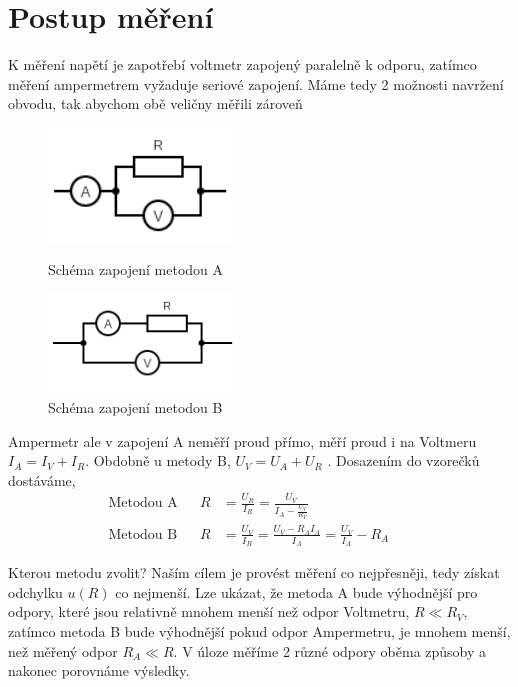 \documentclass[a4paper,11pt]{article}
\begin{document}
\section{Postup měření} 

K měření napětí je zapotřebí voltmetr zapojený paralelně k odporu, zatímco měření ampermetrem vyžaduje seriové zapojení.
Máme tedy 2 možnosti navržení obvodu, tak abychom obě veličny měřili zároveň

\begin{figure}[htbp]
  \begin{minipage}[t]{0.45\textwidth}
    \centering
    \includegraphics[width=5cm]{circuitA.png}
    \caption{Schéma zapojení metodou A}%
  \end{minipage}
  \hfil
  \begin{minipage}[t]{0.45\textwidth}
    \centering
    \includegraphics[width=5cm]{circuitB.png}
    \caption{Schéma zapojení metodou B}%
  \end{minipage}
\end{figure}

Ampermetr ale v zapojení A neměří proud přímo, měří proud i na Voltmeru $I_A = I_V + I_R$. Obdobně u metody B, $U_V = U_A + U_R$ . Dosazením do vzorečků dostáváme, \\

\begin{align}
  \label{eq:2}
  \text{Metodou A} & & R &= \frac{U_R}{I_R} = \frac{U_V}{I_A - \frac{U_V}{R_V}} & & \\[5pt]
  \label{eq:3}
  \text{Metodou B} & & R &= \frac{U_V}{I_R} = \frac{U_V - R_AI_A}{I_A} = \frac{U_V}{I_A} - R_A & &
\end{align}

Kterou metodu zvolit? Naším cílem je provést měření co nejpřesněji, tedy získat odchylku $u(R)$ co nejmenší.
Lze ukázat, že metoda A bude výhodnější pro odpory, které jsou relativně mnohem menší než odpor Voltmetru, $R \ll R_V$, 
zatímco metoda B bude výhodnější pokud odpor Ampermetru, je mnohem menší, než měřený odpor $R_A \ll R$. 
V úloze měříme 2 různé odpory oběma způsoby a nakonec porovnáme výsledky. \\
\end{document}

